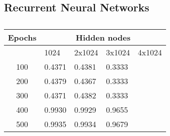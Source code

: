 \subsection{Recurrent Neural Networks}
\begin{table} [H]
	\caption{}
	\begin{tabularx}{\textwidth}{c|XXXX} \hline\hline
		\label{tab:rnn}
		\textbf{Epochs}& \multicolumn{4}{c}{\textbf{Hidden nodes}}\\ \hline
		&1024&2x1024&3x1024&4x1024\\ \hline
		
		100& 0.4371 & 0.4381 & 0.3333 & \\
		200& 0.4379 & 0.4367 & 0.3333 & \\
		300& 0.4371 & 0.4382 & 0.3333 & \\
		400& 0.9930 & 0.9929 & 0.9655 & \\
		500& 0.9935 & 0.9934 & 0.9679 & \\ \hline\hline
	\end{tabularx}
\end{table}
